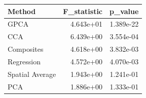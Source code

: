 \begin{tabular}{lrr}
\toprule
Method & F_statistic & p_value \\
\midrule
GPCA & 4.643e+01 & 1.389e-22 \\
CCA & 6.439e+00 & 3.554e-04 \\
Composites & 4.618e+00 & 3.832e-03 \\
Regression & 4.572e+00 & 4.070e-03 \\
Spatial Average & 1.943e+00 & 1.241e-01 \\
PCA & 1.886e+00 & 1.333e-01 \\
\bottomrule
\end{tabular}
